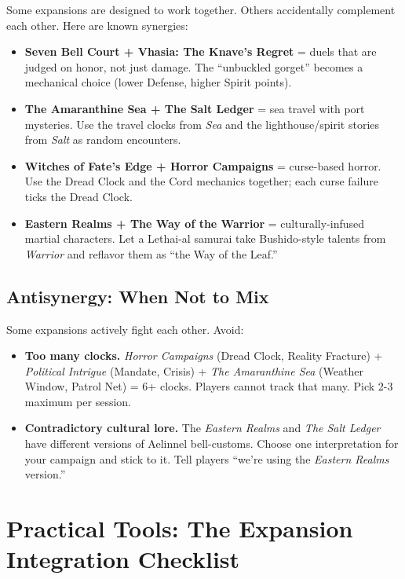 Some expansions are designed to work together. Others accidentally complement each other. Here are known synergies:

\begin{itemize}
\item \textbf{Seven Bell Court + Vhasia: The Knave's Regret} = duels that are judged on honor, not just damage. The “unbuckled gorget” becomes a mechanical choice (lower Defense, higher Spirit points).
\item \textbf{The Amaranthine Sea + The Salt Ledger} = sea travel with port mysteries. Use the travel clocks from \textit{Sea} and the lighthouse/spirit stories from \textit{Salt} as random encounters.
\item \textbf{Witches of Fate's Edge + Horror Campaigns} = curse-based horror. Use the Dread Clock and the Cord mechanics together; each curse failure ticks the Dread Clock.
\item \textbf{Eastern Realms + The Way of the Warrior} = culturally-infused martial characters. Let a Lethai-al samurai take Bushido-style talents from \textit{Warrior} and reflavor them as “the Way of the Leaf.”
\end{itemize}

\subsection{Antisynergy: When Not to Mix}

Some expansions actively fight each other. Avoid:

\begin{itemize}
\item \textbf{Too many clocks.} \textit{Horror Campaigns} (Dread Clock, Reality Fracture) + \textit{Political Intrigue} (Mandate, Crisis) + \textit{The Amaranthine Sea} (Weather Window, Patrol Net) = 6+ clocks. Players cannot track that many. Pick 2-3 maximum per session.
\item \textbf{Contradictory cultural lore.} The \textit{Eastern Realms} and \textit{The Salt Ledger} have different versions of Aelinnel bell-customs. Choose one interpretation for your campaign and stick to it. Tell players “we're using the \textit{Eastern Realms} version.”
\end{itemize}

\section{Practical Tools: The Expansion Integration Checklist}


